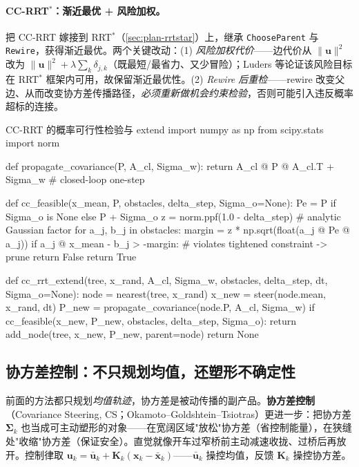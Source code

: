 \paragraph{CC-RRT$^*$：渐近最优 + 风险加权。}
把 CC-RRT 嫁接到 RRT$^*$（\cref{sec:plan-rrtstar}）上，继承 \texttt{ChooseParent} 与 \texttt{Rewire}，获得渐近最优。两个关键改动：(1) \emph{风险加权代价}——边代价从 $\|\mathbf{u}\|^2$ 改为 $\|\mathbf{u}\|^2+\lambda\sum_k\delta_{j,k}$（既最短/最省力、又少冒险）；Luders 等论证该风险目标在 RRT$^*$ 框架内可用，故保留渐近最优性。(2) \emph{Rewire 后重检}——rewire 改变父边、从而改变协方差传播路径，\emph{必须重新做机会约束检验}，否则可能引入违反概率超标的连接。

\begin{codebox}[Python]{CC-RRT 的概率可行性检验与 extend}
import numpy as np
from scipy.stats import norm

def propagate_covariance(P, A_cl, Sigma_w):
    return A_cl @ P @ A_cl.T + Sigma_w     # closed-loop one-step

def cc_feasible(x_mean, P, obstacles, delta_step, Sigma_o=None):
    Pe = P if Sigma_o is None else P + Sigma_o
    z = norm.ppf(1.0 - delta_step)         # analytic Gaussian factor
    for a_j, b_j in obstacles:
        margin = z * np.sqrt(float(a_j @ Pe @ a_j))
        if a_j @ x_mean - b_j > -margin:   # violates tightened constraint -> prune
            return False
    return True

def cc_rrt_extend(tree, x_rand, A_cl, Sigma_w, obstacles, delta_step, dt, Sigma_o=None):
    node  = nearest(tree, x_rand)
    x_new = steer(node.mean, x_rand, dt)
    P_new = propagate_covariance(node.P, A_cl, Sigma_w)
    if cc_feasible(x_new, P_new, obstacles, delta_step, Sigma_o):
        return add_node(tree, x_new, P_new, parent=node)
    return None
\end{codebox}

\subsection{协方差控制：不只规划均值，还塑形不确定性}
\label{sec:cc-cs}

前面的方法都只规划\emph{均值轨迹}，协方差是被动传播的副产品。\textbf{协方差控制}（Covariance Steering, CS；Okamoto--Goldshtein--Tsiotras\cite{okamoto2018optimal}）更进一步：把协方差 $\boldsymbol{\Sigma}_k$ 也当成可主动塑形的对象——在宽阔区域"放松"协方差（省控制能量），在狭缝处"收缩"协方差（保证安全）。直觉就像开车过窄桥前主动减速收拢、过桥后再放开。控制律取 $\mathbf{u}_k=\bar{\mathbf{u}}_k+\mathbf{K}_k(\mathbf{x}_k-\bar{\mathbf{x}}_k)$——$\bar{\mathbf{u}}_k$ 操控均值，反馈 $\mathbf{K}_k$ 操控协方差。

